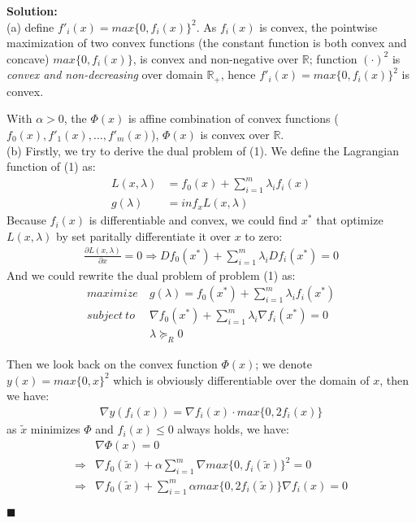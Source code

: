 \documentclass{article}
\newenvironment{solution}                               %
{\textbf{Solution:} \\}{$\blacksquare$\newline}         %
\newcommand{\leadto}{\Rightarrow}                       %
\newcommand{\domR}{\mathbb{R}}                          %
\begin{document}
\begin{solution}
    (a) define $f'_i(x) = max\{0, f_i(x)\}^2$. As $f_i(x)$ is convex, the pointwise maximization of two convex functions (the constant function is both convex and concave) $max\{0, f_i(x)\}$, is convex and non-negative over $\domR$;    
    function $(\cdot)^2$ is \textit{convex and non-decreasing} over domain $\domR_+$, hence $f'_i(x) = max\{0, f_i(x)\}^2$ is convex.

    With $\alpha > 0$, the $\Phi(x)$ is affine combination of convex functions ($f_0(x), f'_1(x), \dots, f'_m(x)$), $\Phi(x)$ is convex over $\domR$. \\

    (b) Firstly, we try to derive the dual problem of (1). We define the Lagrangian function of (1) as:
    \begin{align*}
        L(x, \lambda) &= f_0(x) + \sum_{i=1}^m \lambda_i f_i(x) \\
        g(\lambda) &= inf_{x} L(x, \lambda)
    \end{align*}
    Because $f_i(x)$ is differentiable and convex, we could find $x^*$ that optimize $L(x, \lambda)$ by set paritally differentiate it over $x$ to zero:
    \begin{gather*}
        \frac{\partial{L(x, \lambda)}}{\partial x} = 0
            \leadto D{f_0}(x^*) + \sum_{i=1}^m \lambda_i D{f_i}(x^*) = 0
    \end{gather*}
    And we could rewrite the dual problem of problem (1) as:
    \begin{align*}
        maximize\ &g(\lambda) = f_0(x^*) + \sum_{i=1}^m \lambda_i f_i(x^*)\\
        subject\ to\ 
            & \nabla{f_0}(x^*) + \sum_{i=1}^m \lambda_i \nabla{f_i}(x^*) = 0 \\
            & \lambda \succeq_R 0
    \end{align*}

    Then we look back on the convex function $\Phi(x)$;
    we denote $y(x) = max\{0, x\}^2$ which is obviously differentiable over the domain of $x$, then we have:
    \begin{align*}
        \nabla y(f_i(x)) = \nabla f_i(x) \cdot max\{0, 2f_i(x)\}
    \end{align*}
    as $\tilde{x}$ minimizes $\Phi$ and $f_i(x) \leq 0$ always holds, we have:
    \begin{align*}
        & \nabla \Phi(x) = 0 \\
        \leadto &\nabla f_0(\tilde{x}) + \alpha \sum_{i=1}^m \nabla max\{0, f_i(\tilde{x})\}^2 = 0 \\
        \leadto &\nabla f_0(\tilde{x}) + \sum_{i=1}^m \alpha max\{0, 2f_i(\tilde{x})\} \nabla{f_i(x)} = 0
    \end{align*}


\end{solution}
\end{document}
